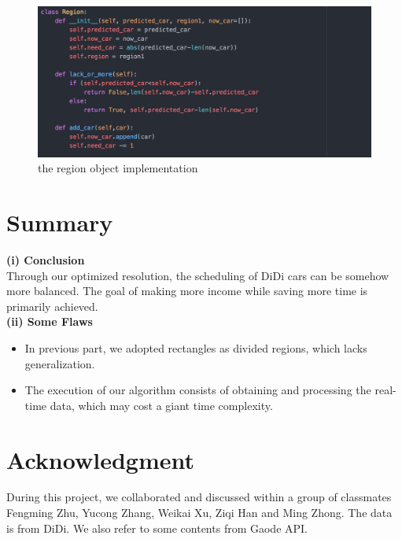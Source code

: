\documentclass[10pt,journal]{IEEEtran}
\begin{document}
 \begin{figure}[!ht]
    \centering
    \includegraphics[width=1.0\columnwidth]{Fig/class_region.png}
    \caption{the region object implementation}
 \end{figure}



\section{Summary}

\textbf{(i) Conclusion}\\

 Through our optimized resolution, the scheduling of DiDi cars can be somehow more balanced. The goal of making more income while saving more time is primarily achieved.\\
 
 \textbf{(ii) Some Flaws}\\
\begin{itemize}
  \item In previous part, we adopted rectangles as divided regions, which lacks generalization.  
  \item The execution of our algorithm consists of obtaining and processing the real-time data, which may cost a giant time complexity. 
\end{itemize}

 
\section*{Acknowledgment}
During this project, we collaborated and discussed within a group of classmates Fengming Zhu, Yucong Zhang, Weikai Xu, Ziqi Han and Ming Zhong. The data is from DiDi. We also refer to some contents from Gaode API\cite{Gaode}.  





\end{document}
